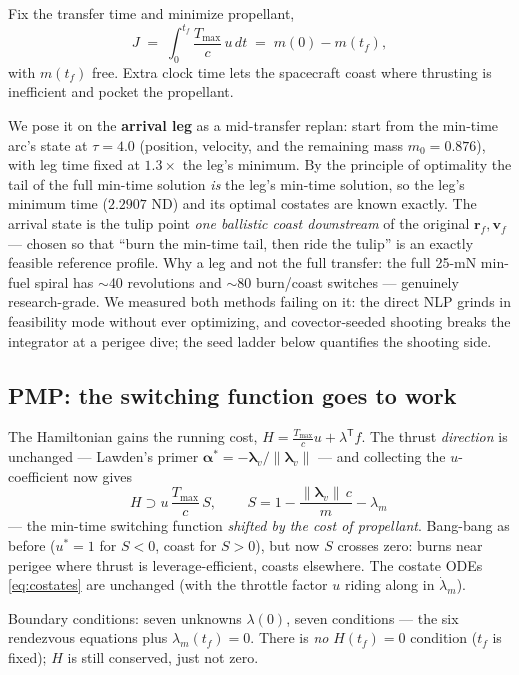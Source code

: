 \documentclass[11pt,letterpaper]{article}
\theoremstyle{noteplain}
\newcommand{\T}{^{\mathsf{T}}}
\newcommand{\rvec}{\mathbf{r}}
\newcommand{\vvec}{\mathbf{v}}
\newcommand{\lamv}{\bm{\lambda}_v}
\newcommand{\lamm}{\lambda_m}
\begin{document}
Fix the transfer time and minimize propellant,
\[
  J \;=\; \int_0^{t_f} \frac{T_{\max}}{c}\,u\,dt \;=\; m(0) - m(t_f),
\]
with $m(t_f)$ free. Extra clock time lets the spacecraft coast where
thrusting is inefficient and pocket the propellant.

We pose it on the \textbf{arrival leg} as a mid-transfer replan: start
from the min-time arc's state at $\tau = 4.0$ (position, velocity, and
the remaining mass $m_0 = 0.876$), with leg time fixed at
$1.3\times$ the leg's minimum. By the principle of optimality the tail
of the full min-time solution \emph{is} the leg's min-time solution, so
the leg's minimum time ($2.2907$ ND) and its optimal costates are known
exactly. The arrival state is the tulip point \emph{one ballistic coast
downstream} of the original $\rvec_f,\vvec_f$ --- chosen so that
``burn the min-time tail, then ride the tulip'' is an exactly feasible
reference profile. Why a leg and not the full transfer: the full 25-mN
min-fuel spiral has $\sim$40 revolutions and $\sim$80 burn/coast
switches --- genuinely research-grade. We measured both methods failing
on it: the direct NLP grinds in feasibility mode without ever
optimizing, and covector-seeded shooting breaks the integrator at a
perigee dive; the seed ladder below quantifies the shooting side.

\subsection*{PMP: the switching function goes to work}

The Hamiltonian gains the running cost,
$H = \tfrac{T_{\max}}{c}u + \lambda\T f$. The thrust \emph{direction} is
unchanged --- Lawden's primer $\bm\alpha^* = -\lamv/\|\lamv\|$ --- and
collecting the $u$-coefficient now gives
\[
  H \supset u\,\frac{T_{\max}}{c}\,S,\qquad
  \boxed{\,S = 1 - \frac{\|\lamv\|\,c}{m} - \lamm\,}
\]
--- the min-time switching function \emph{shifted by the cost of
propellant}. Bang-bang as before ($u^*=1$ for $S<0$, coast for $S>0$),
but now $S$ crosses zero: burns near perigee where thrust is
leverage-efficient, coasts elsewhere. The costate ODEs
\eqref{eq:costates} are unchanged (with the throttle factor $u$ riding
along in $\dot\lamm$).

Boundary conditions: seven unknowns $\lambda(0)$, seven conditions ---
the six rendezvous equations plus $\lamm(t_f) = 0$. There is \emph{no}
$H(t_f) = 0$ condition ($t_f$ is fixed); $H$ is still conserved, just not
zero.
\end{document}
